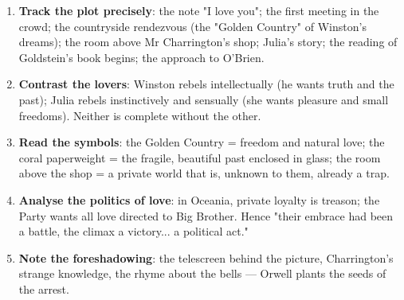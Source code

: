 \documentclass[11pt]{article}
\begin{document}
\begin{methode}
\begin{enumerate}
\item \textbf{Track the plot precisely}: the note "I love you"; the first meeting in the crowd; the countryside rendezvous (the "Golden Country" of Winston's dreams); the room above Mr Charrington's shop; Julia's story; the reading of Goldstein's book begins; the approach to O'Brien.
\item \textbf{Contrast the lovers}: Winston rebels intellectually (he wants truth and the past); Julia rebels instinctively and sensually (she wants pleasure and small freedoms). Neither is complete without the other.
\item \textbf{Read the symbols}: the Golden Country = freedom and natural love; the coral paperweight = the fragile, beautiful past enclosed in glass; the room above the shop = a private world that is, unknown to them, already a trap.
\item \textbf{Analyse the politics of love}: in Oceania, private loyalty is treason; the Party wants all love directed to Big Brother. Hence "their embrace had been a battle, the climax a victory... a political act."
\item \textbf{Note the foreshadowing}: the telescreen behind the picture, Charrington's strange knowledge, the rhyme about the bells — Orwell plants the seeds of the arrest.
\end{enumerate}
\end{methode}
\end{document}
